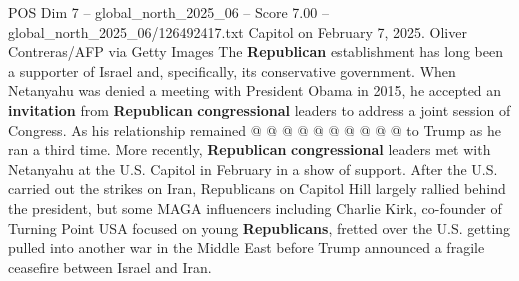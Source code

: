 \begin{textsample}{POS Dim 7 – global\_north\_2025\_06 – Score 7.00 – global\_north\_2025\_06/126492417.txt}
Capitol on February 7, 2025.
Oliver Contreras/AFP via Getty Images The \textbf{Republican} establishment has long been a supporter of Israel and, specifically, its conservative government.
When Netanyahu was denied a meeting with President Obama in 2015, he accepted an \textbf{invitation} from \textbf{Republican} \textbf{congressional} leaders to address a joint session of Congress.
As his relationship remained @ @ @ @ @ @ @ @ @ @ to Trump as he ran a third time.
More recently, \textbf{Republican} \textbf{congressional} leaders met with Netanyahu at the U.S.
Capitol in February in a show of support.
After the U.S. carried out the strikes on Iran, Republicans on Capitol Hill largely rallied behind the president, but some MAGA influencers including Charlie Kirk, co-founder of Turning Point USA focused on young \textbf{Republicans}, fretted over the U.S. getting pulled into another war in the Middle East before Trump announced a fragile ceasefire between Israel and Iran.

\end{textsample}
